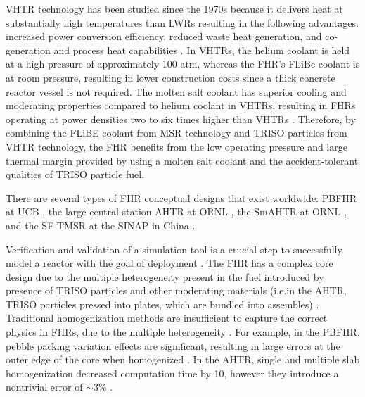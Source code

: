 \gls{VHTR} technology has been studied since the 1970s because it delivers 
heat at substantially high temperatures than \glspl{LWR} resulting in 
the following advantages: increased power conversion efficiency, reduced 
waste heat generation, and co-generation and process heat capabilities 
\cite{scarlat_design_2014}. 
In \glspl{VHTR}, the helium coolant is held at a high pressure of approximately 
100 atm, whereas the \gls{FHR}'s FLiBe coolant is at room pressure, resulting in lower 
construction costs since a thick concrete reactor vessel is not required.
The molten salt coolant has superior cooling and moderating properties compared 
to helium coolant in \glspl{VHTR}, resulting in \glspl{FHR} operating at 
power densities two to six times higher than  \glspl{VHTR} 
\cite{scarlat_design_2014,forsberg_fluoride-salt-cooled_2012}.
Therefore, by combining the FLiBE coolant from \gls{MSR} technology and 
\gls{TRISO} particles from \gls{VHTR} technology, the \gls{FHR} benefits from 
the low operating pressure and large thermal margin provided by using a molten 
salt coolant and the accident-tolerant qualities of \gls{TRISO} particle fuel. 

There are several types of \gls{FHR} conceptual designs that exist
worldwide: \gls{PBFHR} at UCB \cite{scarlat_current_2014,krumwiede_three-dimensional_2013}, 
the large central-station \gls{AHTR} at \gls{ORNL} \cite{holcomb_core_2011, varma_ahtr_2012}, 
the \gls{SmAHTR} at ORNL \cite{greene_pre-conceptual_2010}, and the \gls{SF-TMSR}
at the \gls{SINAP} in China \cite{liu_preliminary_2016}. 

Verification and validation of a simulation tool is a crucial step to successfully 
model a reactor with the goal of deployment \cite{rahnema_phenomena_2019}. 
The \gls{FHR} has a complex core design due to the multiple heterogeneity present 
in the fuel introduced by presence of \gls{TRISO} particles and other moderating 
materials (i.e.in the \gls{AHTR}, \gls{TRISO} particles pressed into plates, which 
are bundled into assembles) \cite{ramey_monte_2018,rahnema_phenomena_2019}.
Traditional homogenization methods are insufficient to capture the correct physics 
in \glspl{FHR}, due to the multiple heterogeneity \cite{ramey_monte_2018}. 
For example, in the \gls{PBFHR}, pebble packing variation effects are significant, 
resulting in large errors at the outer edge of the core when homogenized 
\cite{rahnema_phenomena_2019}. 
In the \gls{AHTR}, single and multiple slab homogenization decreased computation time 
by 10, however they introduce a nontrivial error of $\sim$3\%
\cite{ramey_monte_2018,cisneros_neutronics_2012}.

